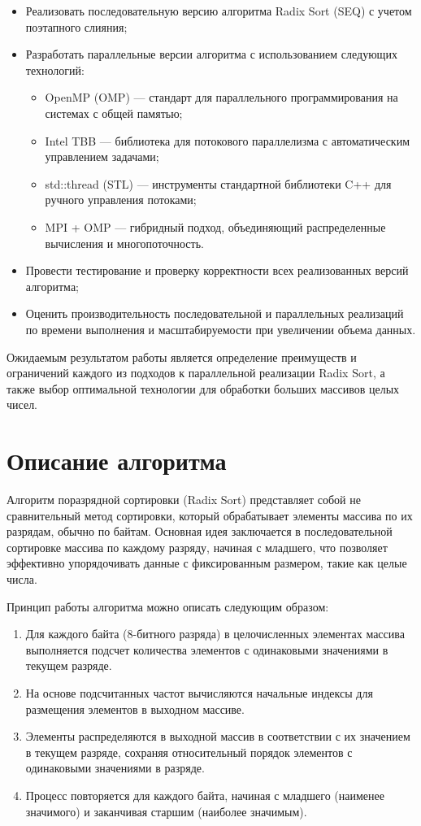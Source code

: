 \documentclass[12pt]{article}
\begin{document}
\begin{itemize}
\item Реализовать последовательную версию алгоритма Radix Sort (SEQ) с учетом поэтапного слияния;
\item Разработать параллельные версии алгоритма с использованием следующих технологий:
\begin{itemize}
\item OpenMP (OMP) — стандарт для параллельного программирования на системах с общей памятью;
\item Intel TBB — библиотека для потокового параллелизма с автоматическим управлением задачами;
\item std::thread (STL) — инструменты стандартной библиотеки C++ для ручного управления потоками;
\item MPI + OMP — гибридный подход, объединяющий распределенные вычисления и многопоточность.
\end{itemize}
\item Провести тестирование и проверку корректности всех реализованных версий алгоритма;
\item Оценить производительность последовательной и параллельных реализаций по времени выполнения и масштабируемости при увеличении объема данных.
\end{itemize}

Ожидаемым результатом работы является определение преимуществ и ограничений каждого из подходов к параллельной реализации Radix Sort, а также выбор оптимальной технологии для обработки больших массивов целых чисел.

\section{Описание алгоритма}

Алгоритм поразрядной сортировки (Radix Sort) представляет собой не сравнительный метод сортировки, который обрабатывает элементы массива по их разрядам, обычно по байтам. Основная идея заключается в последовательной сортировке массива по каждому разряду, начиная с младшего, что позволяет эффективно упорядочивать данные с фиксированным размером, такие как целые числа.

Принцип работы алгоритма можно описать следующим образом:
\begin{enumerate}
\item Для каждого байта (8-битного разряда) в целочисленных элементах массива выполняется подсчет количества элементов с одинаковыми значениями в текущем разряде.
\item На основе подсчитанных частот вычисляются начальные индексы для размещения элементов в выходном массиве.
\item Элементы распределяются в выходной массив в соответствии с их значением в текущем разряде, сохраняя относительный порядок элементов с одинаковыми значениями в разряде.
\item Процесс повторяется для каждого байта, начиная с младшего (наименее значимого) и заканчивая старшим (наиболее значимым).
\end{enumerate}
\end{document}

